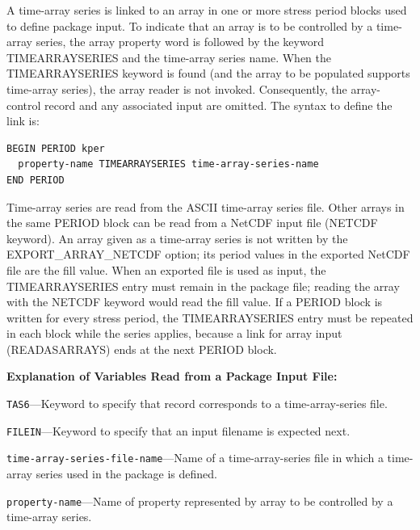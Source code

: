 A time-array series is linked to an array in one or more stress period blocks used to define package input. To indicate that an array is to be controlled by a time-array series, the array property word is followed by the keyword TIMEARRAYSERIES and the time-array series name. When the TIMEARRAYSERIES keyword is found (and the array to be populated supports time-array series), the array reader is not invoked. Consequently, the array-control record and any associated input are omitted. The syntax to define the link is:

\begin{lstlisting}[style=blockdefinition]
BEGIN PERIOD kper
  property-name TIMEARRAYSERIES time-array-series-name
END PERIOD
\end{lstlisting}

Time-array series are read from the ASCII time-array series file. Other arrays in the same PERIOD block can be read from a NetCDF input file (NETCDF keyword). An array given as a time-array series is not written by the EXPORT\_ARRAY\_NETCDF option; its period values in the exported NetCDF file are the fill value. When an exported file is used as input, the TIMEARRAYSERIES entry must remain in the package file; reading the array with the NETCDF keyword would read the fill value. If a PERIOD block is written for every stress period, the TIMEARRAYSERIES entry must be repeated in each block while the series applies, because a link for array input (READASARRAYS) ends at the next PERIOD block.

\noindent \textbf{Explanation of Variables Read from a Package Input File:}

\begin{description}
\item \texttt{TAS6}---Keyword to specify that record corresponds to a time-array-series file.
\item \texttt{FILEIN}---Keyword to specify that an input filename is expected next.
\item \texttt{time-array-series-file-name}---Name of a time-array-series file in which a time-array series used in the package is defined.
\end{description}

\begin{description}
\item \texttt{property-name}---Name of property represented by array to be controlled by a time-array series.
\end{description}

